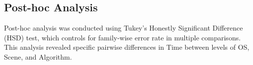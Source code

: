 \documentclass[conference]{IEEEtran}
\begin{document}
\subsection{Post-hoc Analysis}

Post-hoc analysis was conducted using Tukey's Honestly Significant Difference (HSD) test, which controls for family-wise error rate in multiple comparisons. This analysis revealed specific pairwise differences in Time between levels of OS, Scene, and Algorithm.

\begin{table}[H]
\centering
{}
\caption{Compact display comparisons of the post-hoc analysis between Time and OS.}
\label{tab:cdl-os}
\end{table}
\end{document}
